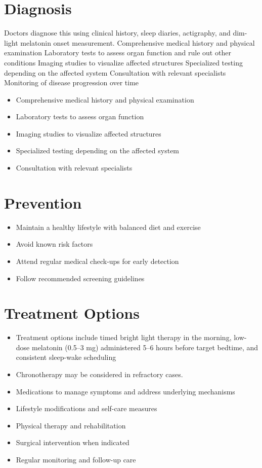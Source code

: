 \section{Diagnosis}
Doctors diagnose this using clinical history, sleep diaries, actigraphy, and dim-light melatonin onset measurement. Comprehensive medical history and physical examination Laboratory tests to assess organ function and rule out other conditions Imaging studies to visualize affected structures Specialized testing depending on the affected system Consultation with relevant specialists Monitoring of disease progression over time

\begin{itemize}[noitemsep]
  \item Comprehensive medical history and physical examination
  \item Laboratory tests to assess organ function
  \item Imaging studies to visualize affected structures
  \item Specialized testing depending on the affected system
  \item Consultation with relevant specialists
\end{itemize}
\section{Prevention}
\begin{itemize}[noitemsep]
  \item Maintain a healthy lifestyle with balanced diet and exercise
  \item Avoid known risk factors
  \item Attend regular medical check-ups for early detection
  \item Follow recommended screening guidelines
\end{itemize}
\section{Treatment Options}
\begin{itemize}[noitemsep]
  \item Treatment options include timed bright light therapy in the morning, low-dose melatonin (0.5--3 mg) administered 5--6 hours before target bedtime, and consistent sleep-wake scheduling
  \item Chronotherapy may be considered in refractory cases.
  \item Medications to manage symptoms and address underlying mechanisms
  \item Lifestyle modifications and self-care measures
  \item Physical therapy and rehabilitation
  \item Surgical intervention when indicated
  \item Regular monitoring and follow-up care
\end{itemize}

